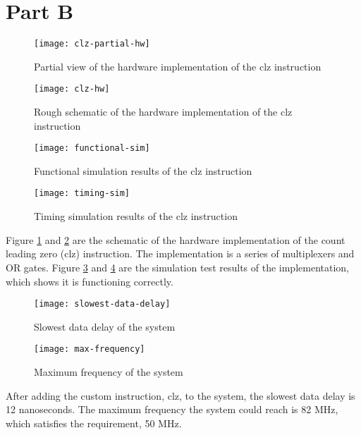\newpage
\section{Part B}

\begin{figure}[htbp]
   \centering
   \texttt{[image: clz-partial-hw]}
   \caption{Partial view of the hardware implementation of the clz instruction}
   \label{fig:clz-partial-hw}
\end{figure}

\begin{figure}[htbp]
   \centering
   \texttt{[image: clz-hw]}
   \caption{Rough schematic of the hardware implementation of the clz instruction}
   \label{fig:clz-hw}
\end{figure}

\begin{figure}[htbp]
   \centering
   \texttt{[image: functional-sim]}
   \caption{Functional simulation results of the clz instruction}
   \label{fig:functional-sim}
\end{figure}

\begin{figure}[htbp]
   \centering
   \texttt{[image: timing-sim]}
   \caption{Timing simulation results of the clz instruction}
   \label{fig:timing-sim}
\end{figure}

Figure \ref{fig:clz-partial-hw} and \ref{fig:clz-hw} are the schematic of the hardware implementation of the count leading zero (clz) instruction. The implementation is a series of multiplexers and OR gates. Figure \ref{fig:functional-sim} and \ref{fig:timing-sim} are the simulation test results of the implementation, which shows it is functioning correctly.

\begin{figure}[htbp]
   \centering
   \texttt{[image: slowest-data-delay]}
   \caption{Slowest data delay of the system}
   \label{fig:}
\end{figure}

\begin{figure}[htbp]
   \centering
   \texttt{[image: max-frequency]}
   \caption{Maximum frequency of the system}
   \label{fig:}
\end{figure}

After adding the custom instruction, clz, to the system, the slowest data delay is 12 nanoseconds. The maximum frequency the system could reach is 82 MHz, which satisfies the requirement, 50 MHz.

